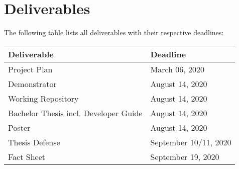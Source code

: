 \chapter{Deliverables}
\label{ch:deliverables}

The following table lists all deliverables with their respective deadlines:\\

\begin{tabularx}{\textwidth}{Xl}
  \toprule
  \textbf{Deliverable} & \textbf{Deadline} \\
  \midrule
  Project Plan & March 06, 2020 \\
  Demonstrator & August 14, 2020 \\
  Working Repository & August 14, 2020 \\
  Bachelor Thesis incl. Developer Guide & August 14, 2020 \\
  Poster & August 14, 2020 \\
  Thesis Defense & September 10/11, 2020 \\
  Fact Sheet & September 19, 2020 \\
  \bottomrule
\end{tabularx}

